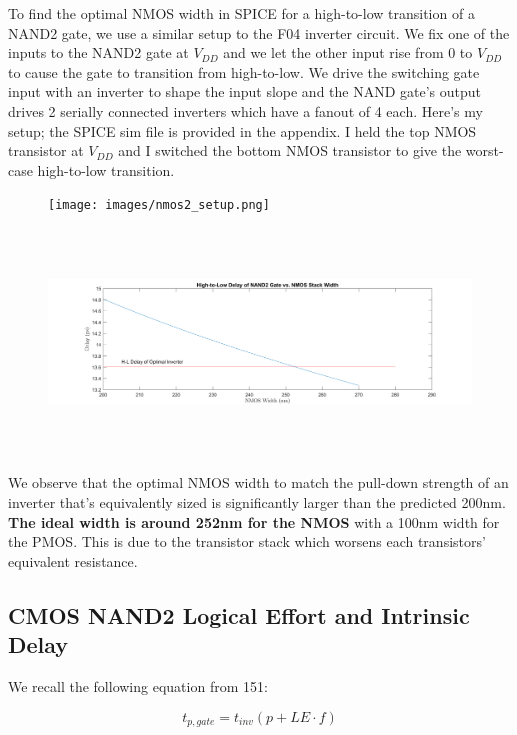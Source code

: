 \documentclass[11pt]{article}
\begin{document}
To find the optimal NMOS width in SPICE for a high-to-low transition of a NAND2 gate, we use a similar setup to the F04 inverter circuit. We fix one of the inputs to the NAND2 gate at $V_{DD}$ and we let the other input rise from 0 to $V_{DD}$ to cause the gate to transition from high-to-low. We drive the switching gate input with an inverter to shape the input slope and the NAND gate's output drives 2 serially connected inverters which have a fanout of 4 each. Here's my setup; the SPICE sim file is provided in the appendix. I held the top NMOS transistor at $V_{DD}$ and I switched the bottom NMOS transistor to give the worst-case high-to-low transition.

\begin{figure}[H]
	\centerline{\texttt{[image: images/nmos2\_setup.png]}}
\end{figure}

\begin{figure}[H]
	\centerline{\includegraphics[height=6cm]{images/nand2_delay_vs_width.png}}
\end{figure}

We observe that the optimal NMOS width to match the pull-down strength of an inverter that's equivalently sized is significantly larger than the predicted 200nm. \textbf{The ideal width is around 252nm for the NMOS} with a 100nm width for the PMOS. This is due to the transistor stack which worsens each transistors' equivalent resistance.
 
\subsection{CMOS NAND2 Logical Effort and Intrinsic Delay}
We recall the following equation from 151:

\begin{equation*}
	t_{p,gate} = t_{inv}(p + LE \cdot f)
\end{equation*}
\end{document}
